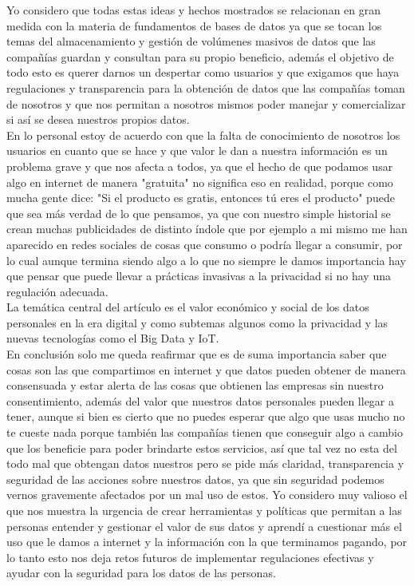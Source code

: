\documentclass[12pt]{report}
\begin{document}
\begin{enumerate}[label=\textbf{\arabic*.}, leftmargin=*]
\begin{enumerate}[label=\textbf{\alph*.}, leftmargin=*, itemsep=1.0em]
Yo considero que todas estas ideas y hechos mostrados se relacionan en gran medida con la materia de fundamentos de bases de datos ya que se tocan los temas del almacenamiento y gestión de volúmenes masivos de datos que las compañías guardan y consultan para su propio beneficio, además el objetivo de todo esto es querer darnos un despertar como usuarios y que exigamos que haya regulaciones y transparencia para la obtención de datos que las compañías toman de nosotros y que nos permitan a nosotros mismos poder manejar y comercializar si así se desea nuestros propios datos.\\
En lo personal estoy de acuerdo con que la falta de conocimiento de nosotros los usuarios en cuanto que se hace y que valor le dan a nuestra información es un problema grave y que nos afecta a todos, ya que el hecho de que podamos usar algo en internet de manera "gratuita" no significa eso en realidad, porque como mucha gente dice: "Si el producto es gratis, entonces tú eres el producto" puede que sea más verdad de lo que pensamos, ya que con nuestro simple historial se crean muchas publicidades de distinto índole que por ejemplo a mi mismo me han aparecido en redes sociales de cosas que consumo o podría llegar a consumir, por lo cual aunque termina siendo algo a lo que no siempre le damos importancia hay que pensar que puede llevar a prácticas invasivas a la privacidad si no hay una regulación adecuada.\\
La temática central del artículo es el valor económico y social de los datos personales en la era digital y como subtemas algunos como la privacidad y las nuevas tecnologías como el Big Data y IoT.\\

En conclusión solo me queda reafirmar que es de suma importancia saber que cosas son las que compartimos en internet y que datos pueden obtener de manera consensuada y estar alerta de las cosas que obtienen las empresas sin nuestro consentimiento, además del valor que nuestros datos personales pueden llegar a tener, aunque si bien es cierto que no puedes esperar que algo que usas mucho no te cueste nada porque también las compañías tienen que conseguir algo a cambio que los beneficie para poder brindarte estos servicios, así que tal vez no esta del todo mal que obtengan datos nuestros pero se pide más claridad, transparencia y seguridad de las acciones sobre nuestros datos, ya que sin seguridad podemos vernos gravemente afectados por un mal uso de estos. Yo considero muy valioso el que nos muestra la urgencia de crear herramientas y políticas que permitan a las personas entender y gestionar el valor de sus datos y aprendí a cuestionar más el uso que le damos a internet y la información con la que terminamos pagando, por lo tanto esto nos deja retos futuros de implementar regulaciones efectivas y ayudar con la seguridad para los datos de las personas.
\end{enumerate}


\end{enumerate}
\end{document}
